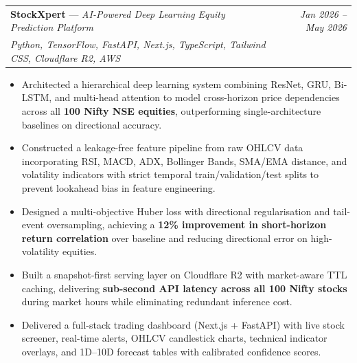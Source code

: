 \documentclass[a4paper,11pt]{article}
\makeatletter
\newcommand{\resumeProject}[4]{
\vspace{0.5mm}\item
    \begin{tabular*}{0.98\textwidth}[t]{l@{\extracolsep{\fill}}r}
        \textbf{#1} \textnormal{---} \textit{#2} & \textit{\footnotesize{#4}} \\
        \footnotesize{\textit{#3}} & \\
    \end{tabular*}
    \vspace{-2.4mm}
}
\newcommand{\resumeItemListStart}{\begin{justify}\begin{itemize}[leftmargin=3ex, rightmargin=2ex, noitemsep,labelsep=1.2mm,itemsep=0mm]\small}
\newcommand{\resumeItemListEnd}{\end{itemize}\end{justify}\vspace{-2mm}}
\makeatother
\begin{document}
    \resumeProject
      {StockXpert}{AI-Powered Deep Learning Equity Prediction Platform}
      {Python, TensorFlow, FastAPI, Next.js, TypeScript, Tailwind CSS, Cloudflare R2, AWS}
      {Jan 2026 -- May 2026}
      \resumeItemListStart
        \item {Architected a hierarchical deep learning system combining ResNet, GRU, Bi-LSTM, and multi-head attention to model cross-horizon price dependencies across all \textbf{100 Nifty NSE equities}, outperforming single-architecture baselines on directional accuracy.}
        \item {Constructed a leakage-free feature pipeline from raw OHLCV data incorporating RSI, MACD, ADX, Bollinger Bands, SMA/EMA distance, and volatility indicators with strict temporal train/validation/test splits to prevent lookahead bias in feature engineering.}
        \item {Designed a multi-objective Huber loss with directional regularisation and tail-event oversampling, achieving a \textbf{12\% improvement in short-horizon return correlation} over baseline and reducing directional error on high-volatility equities.}
        \item {Built a snapshot-first serving layer on Cloudflare R2 with market-aware TTL caching, delivering \textbf{sub-second API latency across all 100 Nifty stocks} during market hours while eliminating redundant inference cost.}
        \item {Delivered a full-stack trading dashboard (Next.js + FastAPI) with live stock screener, real-time alerts, OHLCV candlestick charts, technical indicator overlays, and 1D--10D forecast tables with calibrated confidence scores.}
      \resumeItemListEnd
    \vspace{-2mm}
\end{document}
